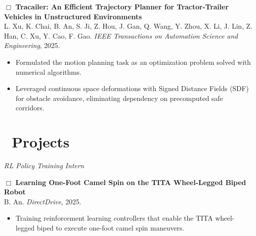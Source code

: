 \documentclass{resume}
\begin{document}
        \begin{adjustwidth}{0.2em}{0em}
            \(\Box\) \textbf{Tracailer: An Efficient Trajectory Planner for Tractor-Trailer Vehicles in Unstructured Environments}\\
            {\small L. Xu, K. Chai, B. An, S. Ji, Z. Hou, J. Gan, Q. Wang, Y. Zhou, X. Li, J. Lin, Z. Han, C. Xu, Y. Cao, F. Gao. \textit{IEEE Transactions on Automation Science and Engineering}, 2025.}
        \end{adjustwidth}
        \begin{adjustwidth}{1.2em}{0em}
            \begin{itemize}
                \item Formulated the motion planning task as an optimization problem solved with numerical algorithms. %
                \item Leveraged continuous space deformations with Signed Distance Fields (SDF) for obstacle avoidance, eliminating dependency on precomputed safe corridors.
            \end{itemize}
        \end{adjustwidth}
\section{\faCode\ Projects}
    \textit{RL Policy Training Intern}

        \begin{adjustwidth}{0.2em}{0em}
            \(\Box\) \textbf{Learning One-Foot Camel Spin on the TITA Wheel-Legged Biped Robot}\\
            {\small B. An. \textit{DirectDrive}, 2025.}
        \end{adjustwidth}
        \begin{adjustwidth}{1.2em}{0em}
            \begin{itemize}
                \item Training reinforcement learning controllers that enable the TITA wheel-legged biped to execute one-foot camel spin maneuvers.
            \end{itemize}
        \end{adjustwidth}
\end{document}
